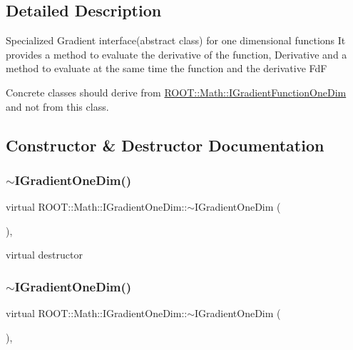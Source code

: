 \subsection{Detailed Description}
Specialized Gradient interface(abstract class) for one dimensional functions It provides a method to evaluate the derivative of the function, Derivative and a method to evaluate at the same time the function and the derivative FdF

Concrete classes should derive from \mbox{\hyperlink{classROOT_1_1Math_1_1IGradientFunctionOneDim}{R\+O\+O\+T\+::\+Math\+::\+I\+Gradient\+Function\+One\+Dim}} and not from this class. 

\subsection{Constructor \& Destructor Documentation}
\mbox{\label{classROOT_1_1Math_1_1IGradientOneDim_ab3a9fce54752c72f4ee4ed520f5cb80f}} 
\subsubsection{\texorpdfstring{$\sim$IGradientOneDim()}{~IGradientOneDim()}\hspace{0.1cm}{\footnotesize\ttfamily [1/2]}}
{\footnotesize\ttfamily virtual R\+O\+O\+T\+::\+Math\+::\+I\+Gradient\+One\+Dim\+::$\sim$\+I\+Gradient\+One\+Dim (\begin{DoxyParamCaption}{ }\end{DoxyParamCaption})\hspace{0.3cm}{\ttfamily [inline]}, {\ttfamily [virtual]}}



virtual destructor 

\mbox{\label{classROOT_1_1Math_1_1IGradientOneDim_ab3a9fce54752c72f4ee4ed520f5cb80f}} 
\subsubsection{\texorpdfstring{$\sim$IGradientOneDim()}{~IGradientOneDim()}\hspace{0.1cm}{\footnotesize\ttfamily [2/2]}}
{\footnotesize\ttfamily virtual R\+O\+O\+T\+::\+Math\+::\+I\+Gradient\+One\+Dim\+::$\sim$\+I\+Gradient\+One\+Dim (\begin{DoxyParamCaption}{ }\end{DoxyParamCaption})\hspace{0.3cm}{\ttfamily [inline]}, {\ttfamily [virtual]}}



